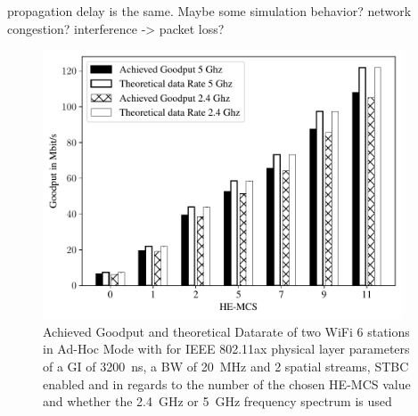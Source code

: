 
propagation delay is the same. Maybe some simulation behavior? network congestion? interference -> packet loss?

\begin{figure}[H]%
	\centering
	\includegraphics[width=0.95\textwidth]{figures/STBC_dataRate_simulation24}
	\caption{Achieved Goodput and theoretical Datarate of two WiFi 6 stations in Ad-Hoc Mode with for IEEE 802.11ax
		physical layer parameters of a \acf{GI} of \SI{3200}{\nano\second}, a \acf{BW} of \SI{20}{\mega\hertz} and 2 spatial streams,
		\ac{STBC} enabled and in regards to the number of the chosen HE-\acf{MCS} value and whether the
		\SI{2.4}{\giga\hertz} or \SI{5}{\giga\hertz} frequency spectrum is used}%
	\label{fig:Data_rate_STBC24}%
\end{figure}
